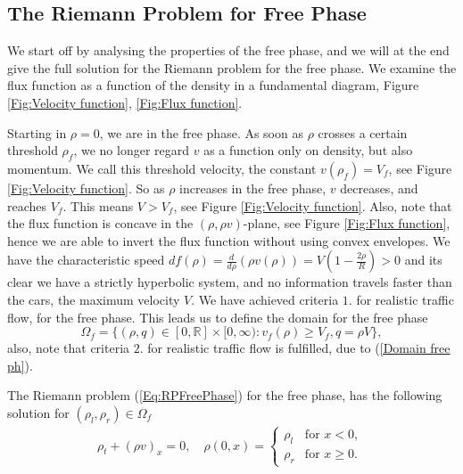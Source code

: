 \documentclass[10pt]{article}
\numberwithin{equation}{section}
\begin{document}
\subsection{The Riemann Problem for Free Phase}\label{RPFreePh}
We start off by analysing the properties of the free phase, and we will at the end give the full solution for the Riemann problem for the free phase. We examine the flux function as a function of the density in a fundamental diagram, Figure \ref{Fig:Velocity function}, \ref{Fig:Flux function}. 
\begin{figure} \centering 
   
\end{figure}
Starting in $\rho = 0$, we are in the free phase. As soon as $\rho$ crosses a certain threshold $\rho_f$, we no longer regard $v$ as a function only on density, but also momentum. We call this threshold velocity, the constant $v(\rho_f) = V_f$, see Figure \ref{Fig:Velocity function}. So as $\rho$ increases in the free phase,  $v$ decreases, and reaches $V_f$. This means $V > V_f $, see Figure \ref{Fig:Velocity function}. Also, note that the flux function is concave in the $(\rho, \rho v)$-plane, see Figure \ref{Fig:Flux function}, hence we are able to invert the flux function without using convex envelopes. We have the characteristic speed $df(\rho) = \frac{d}{d\rho}(\rho v(\rho)) = V(1- \frac{2\rho}{R}) > 0$ and its clear we have a strictly hyperbolic system, and no information travels faster than the cars, the maximum velocity $V$. We have achieved criteria $1.$ for realistic traffic flow, for the free phase. This leads us to define the domain for the free phase \begin{equation}
    \Omega_f = \{(\rho, q) \in [0, \mathbb{R}] \times [0, \infty) : v_f(\rho) \geq V_f, q= \rho V \},
    \label{Domain free ph}
\end{equation} also, note that criteria $2.$ for realistic traffic flow is fulfilled, due to (\ref{Domain free ph}). 

The Riemann problem (\ref{Eq:RPFreePhase}) for the free phase, has the following solution for $(\rho_l, \rho_r) \in \Omega_f$
\begin{align}
    \rho_t + (\rho v)_x = 0,\quad  \rho(0,x) = \begin{cases} 
    \rho_l  & \text{for $x < 0$, }\\
    \rho_r  & \text{for $x \geq 0$.} 
    \end{cases}
    \label{Eq:RPFreePhase}
\end{align}
\end{document}
